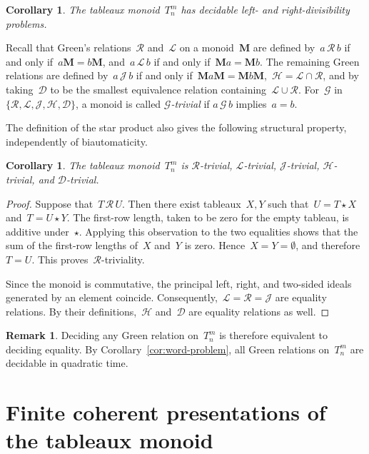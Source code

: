\documentclass[a4paper, twoside, 11pt, english]{article}
\theoremstyle{plain}
\newtheorem{corollary}[subsubsection]{Corollary}
\theoremstyle{definition}
\newtheorem{remark}[subsubsection]{Remark}
\newcommand{\M}{\mathbf{M}}
\begin{document}
\begin{corollary}
The tableaux monoid~$T_n^m$ has decidable left- and
right-divisibility problems.
\end{corollary}

Recall that Green's relations~$\mathcal R$ and~$\mathcal L$ on a monoid~$\M$ are defined by~$a\,\mathcal R\,b$ if and only if~$a\M=b\M$, and~$a\,\mathcal L\,b$ if and only if~$\M a=\M b$. 
The remaining Green relations are defined by~$
a\,\mathcal J\,b$ if and only if~$\M a\M=\M b\M$,~$\mathcal H=\mathcal L\cap\mathcal R$,
and by taking~$\mathcal D$ to be the smallest equivalence relation
containing~$\mathcal L\cup\mathcal R$.
For~$\mathcal G$ in~$
\{\mathcal R,\mathcal L,\mathcal J,\mathcal H,\mathcal D\}$,
a monoid is called \emph{$\mathcal G$-trivial} if
$a\,\mathcal G\,b$ implies~$a=b$.

The definition of the star product also gives the following
structural property, independently of biautomaticity.

\begin{corollary}
\label{cor:green-trivial}
The tableaux monoid~$T_n^m$ is
$\mathcal R$-trivial, $\mathcal L$-trivial, $\mathcal J$-trivial,
$\mathcal H$-trivial, and $\mathcal D$-trivial.
\end{corollary}

\begin{proof}
Suppose that~$T\,\mathcal R\,U$.
Then there exist tableaux~$X,Y$ such that~$U=T\star X$ and~$T=U\star Y$.
The first-row length, taken to be zero for the empty tableau,
is additive under~$\star$.
Applying this observation to the two equalities shows that
the sum of the first-row lengths of~$X$ and~$Y$ is zero.
Hence~$X=Y=\emptyset$, and therefore~$T=U$.
This proves~$\mathcal R$-triviality.

Since the monoid is commutative, the principal left, right,
and two-sided ideals generated by an element coincide.
Consequently,~$\mathcal L=\mathcal R=\mathcal J$ are equality
relations. By their definitions,~$\mathcal H$ and~$\mathcal D$
are equality relations as well.
\end{proof}

\begin{remark}
Deciding any Green relation on~$T_n^m$ is therefore equivalent
to deciding equality. By Corollary~\ref{cor:word-problem},
all Green relations on~$T_n^m$ are decidable in quadratic time.
\end{remark}



\section{Finite coherent presentations of the tableaux monoid}
\label{S:ColumnCoherentPresentationsTableauxMonoid}
\end{document}
